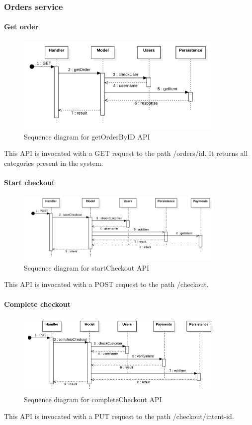 \subsubsection{Orders service}
\paragraph*{Get order}
\begin{figure}[H]
    \includegraphics[width=0.9\textwidth]{res/images/sequence-diagrams/orders/getOrderByID.png}
    \caption{Sequence diagram for getOrderByID API}
\end{figure}
This API is invocated with a GET request to the path /orders/{id}. It returns all categories present in the system.

\paragraph*{Start checkout}
\begin{figure}[H]
    \includegraphics[width=0.9\textwidth]{res/images/sequence-diagrams/orders/startCheckout.png}
    \caption{Sequence diagram for startCheckout API}
\end{figure}
This API is invocated with a POST request to the path /checkout.

\paragraph*{Complete checkout}
\begin{figure}[H]
    \includegraphics[width=0.9\textwidth]{res/images/sequence-diagrams/orders/completeCheckout.png}
    \caption{Sequence diagram for completeCheckout API}
\end{figure}
This API is invocated with a PUT request to the path /checkout/{intent-id}.

